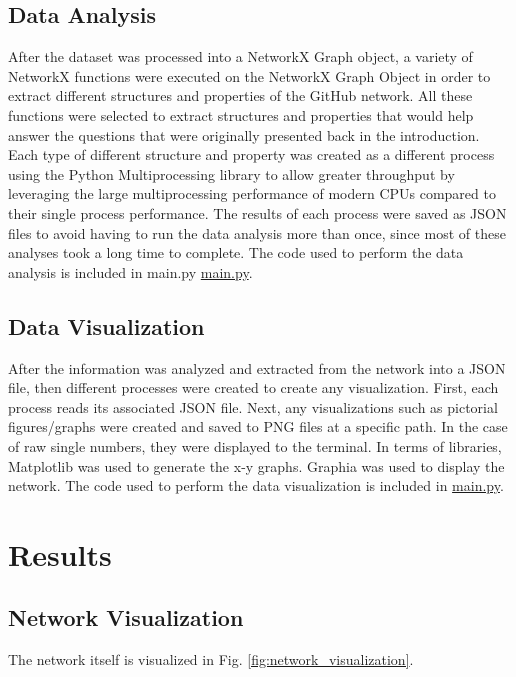 \documentclass[9pt,twocolumn,twoside]{pnas-new}
\begin{document}
{\subsection{Data Analysis} After the dataset was processed into a NetworkX Graph object, a variety of NetworkX functions were executed on the NetworkX Graph Object in order to extract different structures and properties of the GitHub network. All these functions were selected to extract structures and properties that would help answer the questions that were originally presented back in the introduction. Each type of different structure and property was created as a different process using the Python Multiprocessing library to allow greater throughput by leveraging the large multiprocessing performance of modern CPUs compared to their single process performance. The results of each process were saved as JSON files to avoid having to run the data analysis more than once, since most of these analyses took a long time to complete. The code used to perform the data analysis is included in main.py \href{https://github.com/Hockenba/mth450-final-project-report}{main.py}.

\subsection{Data Visualization} After the information was analyzed and extracted from the network into a JSON file, then different processes were created to create any visualization. First, each process reads its associated JSON file. Next, any visualizations such as pictorial figures/graphs were created and saved to PNG files at a specific path. In the case of raw single numbers, they were displayed to the terminal. In terms of libraries, Matplotlib was used to generate the x-y graphs. Graphia was used to display the network. The code used to perform the data visualization is included in \href{https://github.com/Hockenba/mth450-final-project-report}{main.py}.
}

\section{Results}

\subsection{Network Visualization} The network itself is visualized in Fig. \ref{fig:network_visualization}.
\end{document}
